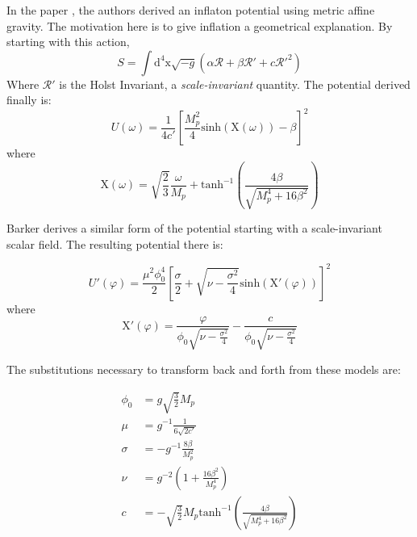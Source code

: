 \documentclass[aps,prd,reprint,preprintnumbers,showpacs,floatfix,nofootinbib,superscript address]{revtex4-2}
\begin{document}
In the paper \cite{Salvio_2022}, the authors derived an inflaton potential using metric affine gravity. The motivation here is to give inflation a geometrical explanation. 
By starting with this action, 
\begin{equation}
    S = \int \text{d}^4\text{x} \sqrt{-g} (\alpha \mathcal{R} + \beta \mathcal{R}' + c \mathcal{R}'^{2})
\end{equation}
Where $\mathcal{R}'$ is the Holst Invariant, a \textit{scale-invariant} quantity. The potential derived finally is: 
\begin{equation}
    U(\omega) = \frac{1}{4 c'} \left[ \frac{M_{p}^{2}}{4} \text{sinh}(\text{X}(\omega)) - \beta  \right]^2
\end{equation}
where
\begin{equation}
    \text{X}(\omega) = \sqrt{\frac{2}{3}} \frac{\omega}{M_{p}} + \text{tanh}^{-1} \left(\frac{4 \beta}{\sqrt{M_{p}^{4}+16 \beta^2}} \right)
\end{equation}

Barker \cite{barker2024poincaregaugetheoryconformal} derives a similar form of the potential starting with a scale-invariant scalar field. The resulting potential there is:

\begin{equation}
    U'(\varphi) = \frac{\mu^2 \phi_{0}^{4}}{2} \left[ \frac{\sigma}{2} + \sqrt{\nu - \frac{\sigma^2}{4}} \text{sinh}\left( \text{X}'(\varphi) \right)  \right]^2
\end{equation}
where
\begin{equation}
    \text{X}'(\varphi) =  \frac{\varphi}{\phi_0 \sqrt{\nu - \frac{\sigma^2}{4}}} - \frac{c}{\phi_0 \sqrt{\nu - \frac{\sigma^2}{4}}}
\end{equation}

The substitutions necessary to transform back and forth from these models are: 

\begin{align}
    \phi_0 &= g \sqrt{\frac{3}{2}} M_p  \nonumber \\
    \mu &= g^{-1} \frac{1}{6 \sqrt{2 c'}}  \nonumber \\
    \sigma &= - g^{-1} \frac{8 \beta}{M_{p}^{2}}  \nonumber \\
    \nu &= g^{-2} \left( 1 + \frac{16 \beta^2}{M_{p}^{4}} \right) \nonumber \\
    c  &= -\sqrt{\frac{3}{2}} M_{p} \text{tanh}^{-1} \left(\frac{4 \beta}{\sqrt{M_{p}^{4}+16 \beta^2}} \right)
\end{align}
\end{document}
